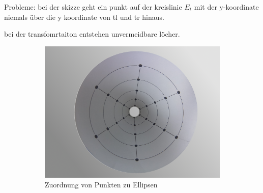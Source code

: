 Probleme: bei der skizze geht ein punkt auf der kreislinie $E_t$ mit der y-koordinate niemals über die y koordinate von tl und tr hinaus.

bei der transfomrtaiton entstehen unvermeidbare löcher.



\begin{figure}[!htb]
	\centering
	\begin{subfigure}{.5\textwidth}
		\centering
		\includegraphics[width=.9\textwidth]{images/coneRasp.jpg}
		\caption{Zuordnung von Punkten zu Ellipsen}
		\label{fig:ellipseMapping}
	\end{subfigure}%
	\begin{subfigure}{.5\textwidth}
		\centering

\end{subfigure}
\end{figure}
